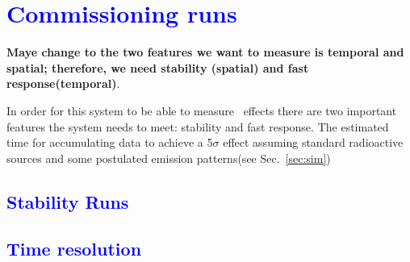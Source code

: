 \section{\textcolor{blue}{Commissioning runs}}
\textbf{Maye change to the two features we want to measure is temporal and spatial; therefore, we need stability (spatial) and fast response(temporal)}.


In order for this system to be able to measure \superradiance\ effects there are two important features the system needs to meet: stability and fast response. The estimated time for accumulating data to achieve a 5$\sigma$ effect assuming standard radioactive sources and some postulated emission patterns(see Sec.~\ref{sec:sim}) 


\subsection{\textcolor{blue}{Stability Runs}}
\subsection{\textcolor{blue}{Time resolution}}
 